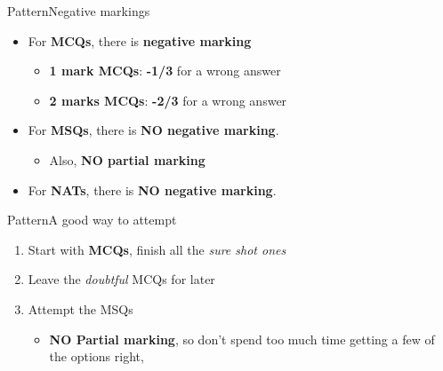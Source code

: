\documentclass[handout]{beamer}
\begin{document}
\begin{frame}{Pattern}{Negative markings}
    \begin{itemize}
        \item For \textbf{MCQs}, there is \textbf{negative marking}
              \begin{itemize}
                  \item \textbf{1 mark MCQs}: \textbf{-1/3} for a wrong answer
                  \item \textbf{2 marks MCQs}: \textbf{-2/3} for a wrong answer
              \end{itemize}
        \item For \textbf{MSQs}, there is \textbf{NO negative marking}.
              \begin{itemize}
                  \item Also, \textbf{NO partial marking}
              \end{itemize}
        \item For \textbf{NATs}, there is \textbf{NO negative marking}.
    \end{itemize}
\end{frame}

\begin{frame}{Pattern}{A good way to attempt}
    \begin{enumerate}
        \item Start with \textbf{MCQs}, finish all the \emph{sure shot ones}
        \item Leave the \emph{doubtful} MCQs for later
        \item Attempt the MSQs
              \begin{itemize}
                  \item \textbf{NO Partial marking}, so don't spend too much time getting a few of the options right,
              \end{itemize}
    \end{enumerate}
\end{frame}
\end{document}
